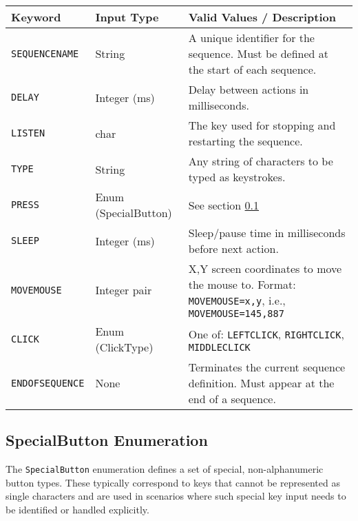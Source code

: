 \begin{table}[h]
	\centering
	\label{tab:sequencer_keywords}
	\begin{tabularx}{\textwidth}{|l|l|X|}
		\hline
		\textbf{Keyword} & \textbf{Input Type} & \textbf{Valid Values / Description} \\
		\hline
		\texttt{SEQUENCENAME} & String & A unique identifier for the sequence. Must be defined at the start of each sequence. \\
		\hline
		\texttt{DELAY} & Integer (ms) & Delay between actions in milliseconds.  \\
		\hline
		\texttt{LISTEN} & char & The key used for stopping and restarting the sequence.  \\
		\hline
		\texttt{TYPE} & String & Any string of characters to be typed as keystrokes. \\
		\hline
		\texttt{PRESS} & Enum (SpecialButton) & See section \ref{SpecialButton-Enumeration}\\
		\hline
		\texttt{SLEEP} & Integer (ms) & Sleep/pause time in milliseconds before next action. \\
		\hline
		\texttt{MOVEMOUSE} & Integer pair & X,Y screen coordinates to move the mouse to. Format: \texttt{MOVEMOUSE=x,y}, i.e., \texttt{MOVEMOUSE=145,887} \\
		\hline
		\texttt{CLICK} & Enum (ClickType) & One of: \texttt{LEFTCLICK}, \texttt{RIGHTCLICK}, \texttt{MIDDLECLICK} \\
		\hline
		\texttt{ENDOFSEQUENCE} & None & Terminates the current sequence definition. Must appear at the end of a sequence. \\
		\hline
	\end{tabularx}
\end{table}

\subsection{SpecialButton Enumeration} \label{SpecialButton-Enumeration}

The \texttt{SpecialButton} enumeration defines a set of special, non-alphanumeric button types. These typically correspond to keys that cannot be represented as single characters and are used in scenarios where such special key input needs to be identified or handled explicitly.

